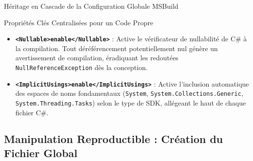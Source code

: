 \documentclass[a4paper,11pt]{report}
\begin{document}
\begin{schemabox}{Héritage en Cascade de la Configuration Globale MSBuild}
\begin{center}
\end{center}
\end{schemabox}

\vspace{0.2cm}

\begin{bestpracticebox}{Propriétés Clés Centralisées pour un Code Propre}
\begin{itemize}
    \item \textbf{\texttt{<Nullable>enable</Nullable>}} : Active le vérificateur de nullabilité de C\# à la compilation. Tout déréférencement potentiellement nul génère un avertissement de compilation, éradiquant les redoutées \texttt{NullReferenceException} dès la conception.
    \item \textbf{\texttt{<ImplicitUsings>enable</ImplicitUsings>}} : Active l'inclusion automatique des espaces de noms fondamentaux (\texttt{System}, \texttt{System.Collections.Generic}, \texttt{System.Threading.Tasks}) selon le type de SDK, allégeant le haut de chaque fichier C\#.
\end{itemize}
\end{bestpracticebox}

\newpage

\subsection*{Manipulation Reproductible : Création du Fichier Global}
\end{document}
